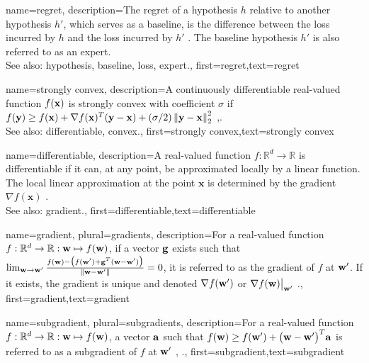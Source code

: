 {name={regret},
	description={The regret of a hypothesis $h$ relative to 
		another hypothesis $h'$, which serves as a baseline, 
		is the difference between the loss incurred by $h$ and the loss 
		incurred by $h'$ \cite{PredictionLearningGames}. 
		The baseline hypothesis $h'$ is also referred to as an expert.
					\\ 
		See also: hypothesis, baseline, loss, expert.},
	first={regret},text={regret} 
}

{name={strongly convex},
	description={A continuously differentiable real-valued 
		function $f({\bf x})$ is strongly convex with coefficient $\sigma$ if $f({\bf y}) \geq f({\bf x}) + \nabla f({\bf x})^{T} ({\bf y} - {\bf x}) + (\sigma/2) \left\Vert  {{\bf y} - {\bf x}} \right\Vert_{2}^{2}$ \cite{nesterov04},\cite[Sec. B.1.1]{CvxAlgBertsekas}.
					\\ 
		See also: differentiable, convex.},
	first={strongly convex},text={strongly convex} 
}

{name={differentiable},
	description={A real-valued function $f: \mathbb{R}^{d} \rightarrow \mathbb{R}$ 
		is differentiable if it can, at any point, be approximated locally by a linear 
		function. The local linear approximation at the point $\mathbf{x}$ is determined 
		by the gradient $\nabla f ( \mathbf{x})$ \cite{RudinBookPrinciplesMatheAnalysis}.
					\\ 
		See also: gradient.},
	first={differentiable},text={differentiable} 
}

{name={gradient}, plural={gradients},
	description={For a real-valued function 
	$f: \mathbb{R}^{d} \rightarrow \mathbb{R}: {\bf w} \mapsto f({\bf w})$, 
	if a vector ${\bf g}$ exists such that 
	$\lim_{{\bf w} \rightarrow {\bf w}'} \frac{f({\bf w}) - \big(f({\bf w}')+ {\bf g}^{T} ({\bf w}- {\bf w}') \big) }{\| {\bf w}-{\bf w}'\|}=0$, 
	it is referred to as the gradient of $f$ at ${\bf w}'$. If it exists, the gradient is unique and 
	denoted $\nabla f({\bf w}')$ or $\nabla f({\bf w})\big|_{{\bf w}'}$ \cite{RudinBookPrinciplesMatheAnalysis}.},
	first={gradient},text={gradient} 
}

{name={subgradient}, plural={subgradients},
description={For a real-valued function $f: \mathbb{R}^{d} \rightarrow \mathbb{R}: {\bf w} \mapsto f({\bf w})$, 
		a vector ${\bf a}$ such that $f({\bf w}) \geq  f({\bf w}') +\big({\bf w}-{\bf w}' \big)^{T} {\bf a}$ is 
		referred to as a subgradient of $f$ at ${\bf w}'$ \cite{BertCvxAnalOpt}, \cite{BertsekasNonLinProgr}.},
	first={subgradient},text={subgradient} 
}

